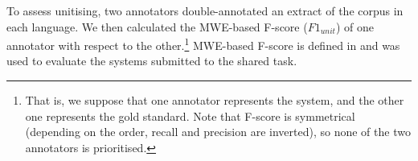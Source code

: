 \documentclass[output=paper,modfonts]{langscibook}
\begin{document}
\largerpage
To assess unitising, two annotators double-annotated an extract of the corpus in each language. We then calculated the MWE-based F-score ($F1_{unit}$) of one annotator with respect to the other.\footnote{That is, we suppose that one annotator represents the system, and the other one represents the gold standard. Note that F-score is symmetrical (depending on the order, recall and precision are inverted), so none of the two annotators is prioritised.} MWE-based F-score is defined in \citet{MWEWorkshop} and was used to evaluate the systems submitted to the shared task.  %
\end{document}
